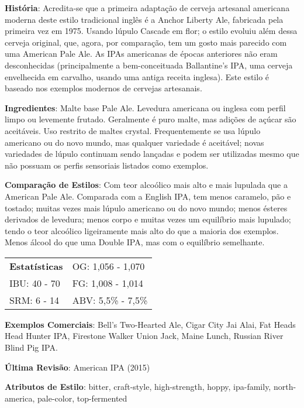\textbf{História}: Acredita-se que a primeira adaptação de cerveja artesanal americana moderna deste estilo tradicional inglês é a Anchor Liberty Ale, fabricada pela primeira vez em 1975. Usando lúpulo Cascade em flor; o estilo evoluiu além dessa cerveja original, que, agora, por comparação, tem um gosto mais parecido com uma American Pale Ale. As IPAs americanas de épocas anteriores não eram desconhecidas (principalmente a bem-conceituada Ballantine's IPA, uma cerveja envelhecida em carvalho, usando uma antiga receita inglesa). Este estilo é baseado nos exemplos modernos de cervejas artesanais.

\textbf{Ingredientes}: Malte base Pale Ale. Levedura americana ou inglesa com perfil limpo ou levemente frutado. Geralmente é puro malte, mas adições de açúcar são aceitáveis. Uso restrito de maltes crystal. Frequentemente se usa lúpulo americano ou do novo mundo, mas qualquer variedade é aceitável; novas variedades de lúpulo continuam sendo lançadas e podem ser utilizadas mesmo que não possuam os perfis sensoriais listados como exemplos.

\textbf{Comparação de Estilos}: Com teor alcoólico mais alto e mais lupulada que a American Pale Ale. Comparada com a English IPA, tem menos caramelo, pão e tostado; muitas vezes mais lúpulo americano ou do novo mundo; menos ésteres derivados de levedura; menos corpo e muitas vezes um equilíbrio mais lupulado; tendo o teor alcoólico ligeiramente mais alto do que a maioria dos exemplos. Menos álcool do que uma Double IPA, mas com o equilíbrio semelhante.

\begin{tabular}{@{}p{35mm}p{35mm}@{}}
  \textbf{Estatísticas} & OG: 1,056 - 1,070 \\
  IBU: 40 - 70  & FG: 1,008 - 1,014 \\
  SRM: 6 - 14  & ABV: 5,5\% - 7,5\%
\end{tabular}

\textbf{Exemplos Comerciais}: Bell's Two-Hearted Ale, Cigar City Jai Alai, Fat Heads Head Hunter IPA, Firestone Walker Union Jack, Maine Lunch, Russian River Blind Pig IPA.

\textbf{Última Revisão}: American IPA (2015)

\textbf{Atributos de Estilo}: bitter, craft-style, high-strength, hoppy, ipa-family, north-america, pale-color, top-fermented

